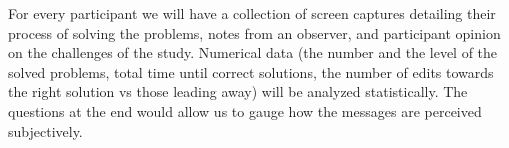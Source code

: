 \documentclass[submission,copyright,creativecommons]{eptcs}
\begin{document}
For every participant we will have a collection of screen captures detailing their process of solving the problems, notes from an observer, and participant opinion on the challenges of the study.
Numerical data (the number and the level of the solved problems, total time until correct solutions, the number of edits towards the right solution vs those leading away) will be analyzed statistically. 
The questions at the end would allow us to gauge how the messages are perceived subjectively.
\end{document}
